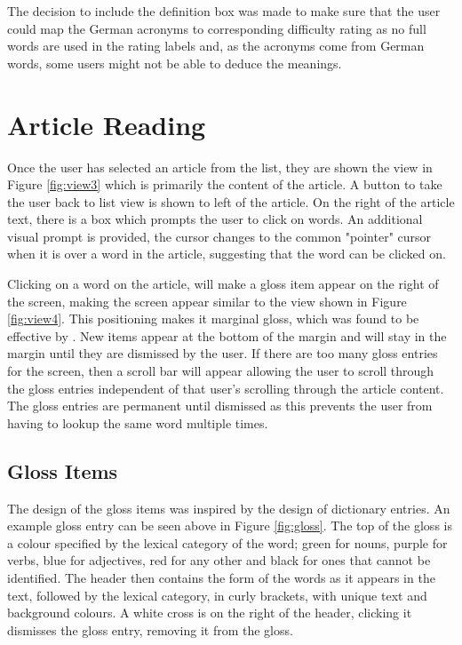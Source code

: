 The decision to include the definition box was made to make sure that the user could map the German acronyms to corresponding difficulty rating as no full words are used in the rating labels and, as the acronyms come from German words, some users might not be able to deduce the meanings.  

\section{Article Reading}

Once the user has selected an article from the list, they are shown the view in Figure \ref{fig:view3} which is primarily the content of the article. A button to take the user back to list view is shown to left of the article. On the right of the article text, there is a box which prompts the user to click on words. An additional visual prompt is provided, the cursor changes to the common "pointer" cursor when it is over a word in the article, suggesting that the word can be clicked on.



Clicking on a word on the article, will make a gloss item appear on the right of the screen, making the screen appear similar to the view shown in Figure \ref{fig:view4}. This positioning makes it marginal gloss, which was found to be effective by \autocite{abuseileek2008}. New items appear at the bottom of the margin and will stay in the margin until they are dismissed by the user. If there are too many gloss entries for the screen, then a scroll bar will appear allowing the user to scroll through the gloss entries independent of that user's scrolling through the article content. The gloss entries are permanent until dismissed as this prevents the user from having to lookup the same word multiple times.


 
\subsection{Gloss Items}



The design of the gloss items was inspired by the design of dictionary entries. An example gloss entry can be seen above in Figure \ref{fig:gloss}. The top of the gloss is a colour specified by the lexical category of the word; green for nouns, purple for verbs, blue for adjectives, red for any other and black for ones that cannot be identified. The header then contains the form of the words as it appears in the text, followed by the lexical category, in curly brackets, with unique text and background colours. A white cross is on the right of the header, clicking it dismisses the gloss entry, removing it from the gloss. 

